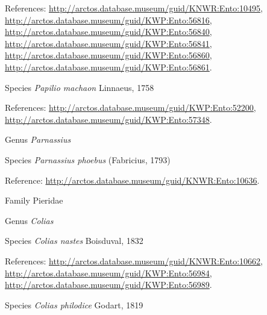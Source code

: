 \documentclass[9pt, article]{memoir}
\begin{document}
\begin{multicols}{2}
\vspace{6pt}References: 
\url{http://arctos.database.museum/guid/KNWR:Ento:10495}, 
\url{http://arctos.database.museum/guid/KWP:Ento:56816}, 
\url{http://arctos.database.museum/guid/KWP:Ento:56840}, 
\url{http://arctos.database.museum/guid/KWP:Ento:56841}, 
\url{http://arctos.database.museum/guid/KWP:Ento:56860}, 
\url{http://arctos.database.museum/guid/KWP:Ento:56861}.

\vspace{6pt}\noindent\hspace{36pt}Species \textit{Papilio machaon} Linnaeus, 1758


\vspace{6pt}References: 
\url{http://arctos.database.museum/guid/KWP:Ento:52200}, 
\url{http://arctos.database.museum/guid/KWP:Ento:57348}.

\vspace{6pt}\noindent\hspace{30pt}Genus \textit{Parnassius}


\vspace{6pt}\noindent\hspace{36pt}Species \textit{Parnassius phoebus} (Fabricius, 1793)


\vspace{6pt}Reference: 
\url{http://arctos.database.museum/guid/KNWR:Ento:10636}.

\vspace{6pt}\noindent\hspace{24pt}Family Pieridae


\vspace{6pt}\noindent\hspace{30pt}Genus \textit{Colias}


\vspace{6pt}\noindent\hspace{36pt}Species \textit{Colias nastes} Boisduval, 1832


\vspace{6pt}References: 
\url{http://arctos.database.museum/guid/KNWR:Ento:10662}, 
\url{http://arctos.database.museum/guid/KWP:Ento:56984}, 
\url{http://arctos.database.museum/guid/KWP:Ento:56989}.

\vspace{6pt}\noindent\hspace{36pt}Species \textit{Colias philodice} Godart, 1819



\end{multicols}
\end{document}
